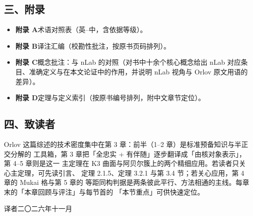 \subsection*{三、附录}

\begin{itemize}[leftmargin=2.6em,itemsep=1pt,topsep=2pt]
\item \textbf{附录 A}\quad 术语对照表（英--中，含依据等级）。
\item \textbf{附录 B}\quad 译注汇编（校勘性批注，按原书页码排列）。
\item \textbf{附录 C}\quad 概念批注：与 nLab 的对照（对书中十余个核心概念给出
      nLab 对应条目、准确定义与在本文论证中的作用，并说明 nLab 视角与
      Orlov 原文用语的差异）。
\item \textbf{附录 D}\quad 定理与定义索引（按原书编号排列，附中文章节定位）。
\end{itemize}

\subsection*{四、致读者}

Orlov 这篇综述的技术密度集中在第 3 章：前半（1--2 章）是标准预备知识与半正交分解的
工具箱，第 3 章把「全忠实 + 有伴随」逐步翻译成「由核对象表示」，第 4--5 章则是这一
主定理在 K3 曲面与阿贝尔簇上的两个精细应用。若读者只关心主定理，可先读引言、
定理 2.1.5、定理 3.2.1 与第 3.4 节；若关心应用，第 4 章的 Mukai 格与第 5 章的
等距同构判据是两条彼此平行、方法相通的主线。每章末的「本章回顾与评注」与每节首的
「本节重点」可供快速定位。

\vspace{1em}
\noindent\hfill 译者\quad 二〇二六年十一月
\clearpage
